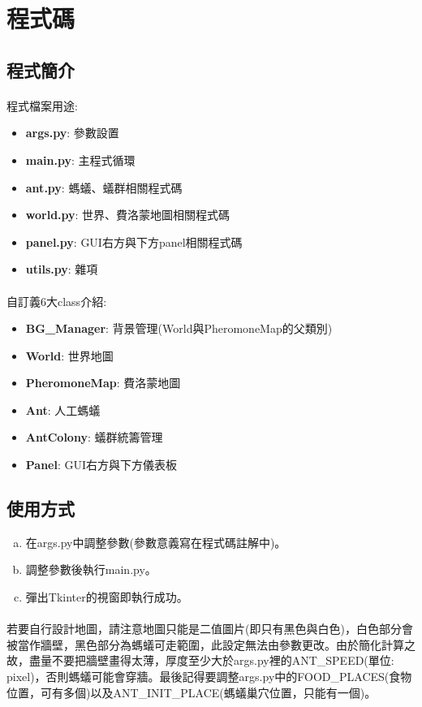 \documentclass[]{article}
\begin{document}
\clearpage
\section{程式碼}

\subsection{程式簡介}
\paragraph{}
程式檔案用途:
\begin{itemize}
	\item \textbf{args.py}: 參數設置
	\item \textbf{main.py}: 主程式循環
	\item \textbf{ant.py}: 螞蟻、蟻群相關程式碼
	\item \textbf{world.py}: 世界、費洛蒙地圖相關程式碼
	\item \textbf{panel.py}: GUI右方與下方panel相關程式碼
	\item \textbf{utils.py}: 雜項
\end{itemize}
\paragraph{}
自訂義6大class介紹:
\begin{itemize}
	\item \textbf{BG\_Manager}: 背景管理(World與PheromoneMap的父類別)
	\item \textbf{World}: 世界地圖
	\item \textbf{PheromoneMap}: 費洛蒙地圖
	\item \textbf{Ant}: 人工螞蟻
	\item \textbf{AntColony}: 蟻群統籌管理
	\item \textbf{Panel}: GUI右方與下方儀表板
\end{itemize}

\subsection{使用方式}
\begin{enumerate}[(a)]
	\item 在args.py中調整參數(參數意義寫在程式碼註解中)。
	\item 調整參數後執行main.py。
	\item 彈出Tkinter的視窗即執行成功。
\end{enumerate}
\paragraph{}
若要自行設計地圖，請注意地圖只能是二值圖片(即只有黑色與白色)，白色部分會被當作牆壁，黑色部分為螞蟻可走範圍，此設定無法由參數更改。由於簡化計算之故，盡量不要把牆壁畫得太薄，厚度至少大於args.py裡的ANT\_SPEED(單位: pixel)，否則螞蟻可能會穿牆。最後記得要調整args.py中的FOOD\_PLACES(食物位置，可有多個)以及ANT\_INIT\_PLACE(螞蟻巢穴位置，只能有一個)。
\end{document}
